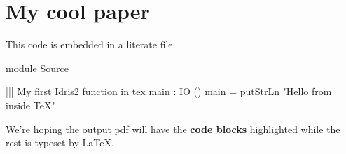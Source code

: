 \documentclass{article}
\begin{document}
\section{My cool paper}

This code is embedded in a literate file.

\begin{code}
module Source


||| My first Idris2 function in tex
main : IO ()
main = putStrLn "Hello from inside TeX"
\end{code}

We're hoping the output pdf will have the \textbf{code blocks} highlighted
while the rest is typeset by \LaTeX{}.
\end{document}
